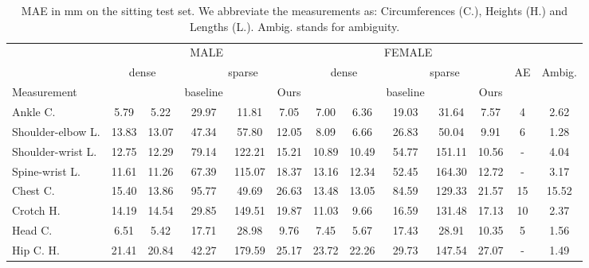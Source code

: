 \begin{table*}[t!]
\scriptsize
\begin{center}
\caption{MAE in mm on the sitting test set. We abbreviate the measurements as: Circumferences (C.), Heights (H.) and Lengths (L.). Ambig. stands for ambiguity.}
\label{tab:caesar-sitting-res}
\begin{tabular}{|l|c|c||c|c|c||c|c||c|c|c|c|c|}
\cline{2-11}
   \multicolumn{1}{c|}{}                    & \multicolumn{5}{c||}{MALE}         & \multicolumn{5}{c|}{FEMALE}       \\ 
\cline{2-13}
   \multicolumn{1}{c|}{}                    & \multicolumn{2}{c||}{dense}         & \multicolumn{3}{c||}{sparse}  & \multicolumn{2}{c||}{dense}         & \multicolumn{3}{c|}{sparse} &   AE  & \multirow{ 2}{*}{\tiny Ambig.} \\ \cline{1-11}
Measurement & {\tiny \cite{scan-db}} & {\tiny \cite{tsoli-mode-based-anthropometry}} & {\tiny baseline} & {\tiny \cite{bojanic_VISAPP24}} & {\tiny Ours} & {\tiny \cite{scan-db}}  & {\tiny \cite{tsoli-mode-based-anthropometry}} & {\tiny baseline} & {\tiny \cite{bojanic_VISAPP24}} & {\tiny Ours} & {\tiny\cite{AE}} & \\ \hline
Ankle C.                & 5.79    & 5.22    & 29.97     & 11.81 & 7.05         & 7.00    & 6.36    & 19.03 & 31.64     & 7.57      & 4  &    2.62     \\
Shoulder-elbow L.       & 13.83   & 13.07   & 47.34     & 57.80 & 12.05         & 8.09    & 6.66    & 26.83 & 50.04     & 9.91      & 6  &    1.28    \\
Shoulder-wrist L.       & 12.75   & 12.29   & 79.14     & 122.21 & 15.21         & 10.89   & 10.49   & 54.77 & 151.11     & 10.56     & -   &   4.04    \\
Spine-wrist L.          & 11.61   & 11.26   & 67.39     & 115.07 & 18.37         & 13.16   & 12.34   & 52.45 & 164.30     & 12.72     & -   &   3.17    \\
Chest C.                & 15.40   & 13.86   & 95.77     & 49.69 & 26.63         & 13.48   & 13.05   & 84.59 & 129.33     & 21.57     & 15  &   15.52    \\
Crotch H.               & 14.19   & 14.54   & 29.85     & 149.51 & 19.87         & 11.03   & 9.66    & 16.59 & 131.48     & 17.13     & 10  &   2.37    \\
Head C.                 & 6.51    & 5.42    & 17.71     & 28.98 & 9.76         & 7.45    & 5.67    & 17.43 & 28.91     & 10.35     & 5   &   1.56    \\
Hip C. H.               & 21.41   & 20.84   & 42.27     & 179.59 & 25.17         & 23.72   & 22.26   & 29.73 & 147.54     & 27.07     & -   &   1.49    \\

\end{tabular}
\end{center}
\end{table*}
